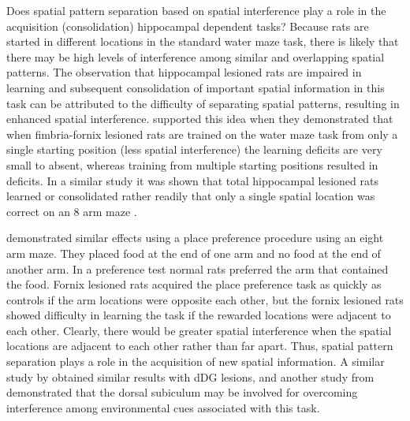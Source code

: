 \documentclass[doc, longtable]{apa6}
\begin{document}
Does spatial pattern separation based on spatial interference play a role in the acquisition (consolidation) hippocampal dependent tasks? Because rats are started in different locations in the standard water maze task, there is likely that there may be high levels of interference among similar and overlapping spatial patterns. The observation that hippocampal lesioned rats are impaired in learning and subsequent consolidation of important spatial information in this task can be attributed  to the difficulty of separating spatial patterns, resulting in enhanced spatial interference. \textcite{Eichenbaum1990a} supported this idea when they demonstrated that when fimbria-fornix lesioned rats are trained on the water maze task from only a single starting position (less spatial interference) the learning deficits are very small to absent, whereas training from multiple starting positions resulted in deficits. In a similar study it was shown that total hippocampal lesioned rats learned or consolidated rather readily that only a single spatial location was correct on an 8 arm maze \parencite{Hunt1994a}. 

\textcite{McDonald1995a} demonstrated similar effects using a place preference procedure using an eight arm maze. They placed food at the end of one arm and no food at the end of another arm. In a preference test normal rats preferred the arm that contained the food. Fornix lesioned rats acquired the place preference task as quickly as controls if the arm locations were opposite each other, but the fornix lesioned rats showed difficulty in learning the task if the rewarded locations were adjacent to each other. Clearly, there would be greater spatial interference when the spatial locations are adjacent to each other rather than far apart. Thus, spatial pattern separation plays a role in the acquisition of new spatial information. A similar study by \textcite{morris2012selective} obtained similar results with dDG lesions, and another study from \textcite{Potvin2009a} demonstrated that the dorsal subiculum may be involved for overcoming interference among environmental cues associated with this task.
\end{document}
